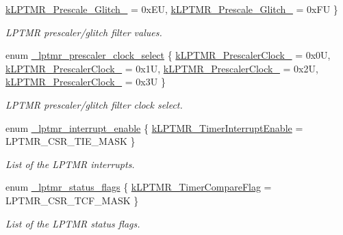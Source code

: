 \begin{DoxyCompactItemize}
\mbox{\hyperlink{group__lptmr_ggad4e93a569a14f82f31f9cac1582dadddafcf75b60e904cb458bcd28cd4f9ec92a}{k\+L\+P\+T\+M\+R\+\_\+\+Prescale\+\_\+\+Glitch\+\_}} = 0x\+EU, 
\mbox{\hyperlink{group__lptmr_ggad4e93a569a14f82f31f9cac1582daddda38731d6f04ade303c0f002ac558c319a}{k\+L\+P\+T\+M\+R\+\_\+\+Prescale\+\_\+\+Glitch\+\_}} = 0x\+FU
 \}
\begin{DoxyCompactList}\small\item\em L\+P\+T\+MR prescaler/glitch filter values. \end{DoxyCompactList}\item 
enum \mbox{\hyperlink{group__lptmr_ga68d8b01f0167f938bfa86442f4772ced}{\+\_\+lptmr\+\_\+prescaler\+\_\+clock\+\_\+select}} \{ \mbox{\hyperlink{group__lptmr_gga68d8b01f0167f938bfa86442f4772ceda6799e08f040c9277a2e30de3b96b69c5}{k\+L\+P\+T\+M\+R\+\_\+\+Prescaler\+Clock\+\_}} = 0x0U, 
\mbox{\hyperlink{group__lptmr_gga68d8b01f0167f938bfa86442f4772ceda36de7a40ece786199804426d58e73c4e}{k\+L\+P\+T\+M\+R\+\_\+\+Prescaler\+Clock\+\_}} = 0x1U, 
\mbox{\hyperlink{group__lptmr_gga68d8b01f0167f938bfa86442f4772ceda2590ba1f8ad0bd638bcec43712213935}{k\+L\+P\+T\+M\+R\+\_\+\+Prescaler\+Clock\+\_}} = 0x2U, 
\mbox{\hyperlink{group__lptmr_gga68d8b01f0167f938bfa86442f4772ceda5aeb8e70968f58667bb2769847585106}{k\+L\+P\+T\+M\+R\+\_\+\+Prescaler\+Clock\+\_}} = 0x3U
 \}
\begin{DoxyCompactList}\small\item\em L\+P\+T\+MR prescaler/glitch filter clock select. \end{DoxyCompactList}\item 
enum \mbox{\hyperlink{group__lptmr_gade9e5cb91c7534d9b9ac51909edae02e}{\+\_\+lptmr\+\_\+interrupt\+\_\+enable}} \{ \mbox{\hyperlink{group__lptmr_ggade9e5cb91c7534d9b9ac51909edae02ea6788e58f3d338bb386463f092e5d94f3}{k\+L\+P\+T\+M\+R\+\_\+\+Timer\+Interrupt\+Enable}} = L\+P\+T\+M\+R\+\_\+\+C\+S\+R\+\_\+\+T\+I\+E\+\_\+\+M\+A\+SK
 \}
\begin{DoxyCompactList}\small\item\em List of the L\+P\+T\+MR interrupts. \end{DoxyCompactList}\item 
enum \mbox{\hyperlink{group__lptmr_ga114bc57ed4e972d512911d9d866a7573}{\+\_\+lptmr\+\_\+status\+\_\+flags}} \{ \mbox{\hyperlink{group__lptmr_gga114bc57ed4e972d512911d9d866a7573ab51c1e072bf8436d8b7546a3777dbadd}{k\+L\+P\+T\+M\+R\+\_\+\+Timer\+Compare\+Flag}} = L\+P\+T\+M\+R\+\_\+\+C\+S\+R\+\_\+\+T\+C\+F\+\_\+\+M\+A\+SK
 \}
\begin{DoxyCompactList}\small\item\em List of the L\+P\+T\+MR status flags. \end{DoxyCompactList}\end{DoxyCompactItemize}
